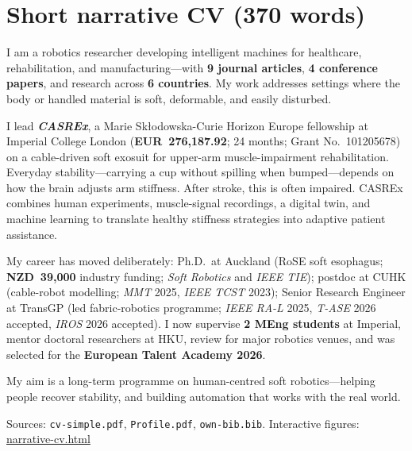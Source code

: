 \documentclass[11pt,a4paper]{article}
\newcommand{\btit}[1]{\textbf{\textit{#1}}}
\begin{document}
\newpage
\label{page:short}

\section*{Short narrative CV (370 words)}

I am a robotics researcher developing intelligent machines for healthcare, rehabilitation, and manufacturing---with \textbf{9 journal articles}, \textbf{4 conference papers}, and research across \textbf{6 countries}. My work addresses settings where the body or handled material is soft, deformable, and easily disturbed.

I lead \btit{CASREx}, a Marie Sk\l{}odowska-Curie Horizon Europe fellowship at Imperial College London (\textbf{EUR~276,187.92}; 24 months; Grant No.~101205678) on a cable-driven soft exosuit for upper-arm muscle-impairment rehabilitation. Everyday stability---carrying a cup without spilling when bumped---depends on how the brain adjusts arm stiffness. After stroke, this is often impaired. CASREx combines human experiments, muscle-signal recordings, a digital twin, and machine learning to translate healthy stiffness strategies into adaptive patient assistance.

My career has moved deliberately: Ph.D.\ at Auckland (RoSE soft esophagus; \textbf{NZD~39,000} industry funding; \textit{Soft Robotics} and \textit{IEEE TIE}); postdoc at CUHK (cable-robot modelling; \textit{MMT} 2025, \textit{IEEE TCST} 2023); Senior Research Engineer at TransGP (led fabric-robotics programme; \textit{IEEE RA-L} 2025, \textit{T-ASE} 2026 accepted, \textit{IROS} 2026 accepted). I now supervise \textbf{2 MEng students} at Imperial, mentor doctoral researchers at HKU, review for major robotics venues, and was selected for the \textbf{European Talent Academy 2026}.

My aim is a long-term programme on human-centred soft robotics---helping people recover stability, and building automation that works with the real world.

\vspace{0.5em}
\begin{center}
\small\color{charcoal}
Sources: \texttt{cv-simple.pdf}, \texttt{Profile.pdf}, \texttt{own-bib.bib}.
Interactive figures: \href{https://bhattner143.github.io/dips/narrative-cv.html}{narrative-cv.html}
\end{center}
\end{document}
